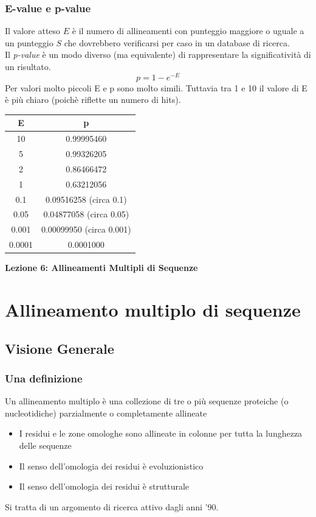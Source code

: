 \documentclass{article}
\begin{document}
\subsubsection{E-value e p-value}
Il valore atteso $E$ è il numero di allineamenti con punteggio
maggiore o uguale a un punteggio $S$ che dovrebbero verificarsi
per caso in un database di ricerca.\\
Il \textit{p-value} è un modo diverso (ma equivalente) di rappresentare
la significatività di un risultato.
$$ p = 1 -e^{-E}$$
Per valori molto piccoli E e p sono molto simili. Tuttavia tra 1 e
10 il valore di E è più chiaro (poichè riflette un numero di hits).
\begin{center}
    \begin{tabular}{c|c}
        E & p \\
        \midrule
        10 & 0.99995460\\
        5 & 0.99326205\\
        2 & 0.86466472\\
        1 & 0.63212056\\
        0.1 & 0.09516258 (circa 0.1)\\
        0.05 & 0.04877058 (circa 0.05)\\
        0.001 & 0.00099950 (circa 0.001)\\
        0.0001 & 0.0001000\\
    \end{tabular}
\end{center}
\begin{titlepage}
    \begin{center}
        \vspace*{1cm}
        \LARGE
        \textbf{Lezione 6: Allineamenti Multipli di Sequenze}

    \end{center}
\end{titlepage}
\section{Allineamento multiplo di sequenze}
\subsection{Visione Generale}
\subsubsection{Una definizione}
Un allineamento multiplo è una collezione di tre o più sequenze proteiche (o nucleotidiche) parzialmente o completamente allineate
\begin{itemize}
    \item I residui e le zone omologhe sono allineate in colonne per tutta la lunghezza delle sequenze
    \item Il senso dell'omologia dei residui è evoluzionistico
    \item Il senso dell'omologia dei residui è strutturale
\end{itemize}
Si tratta di un argomento di ricerca attivo dagli anni '90.
\end{document}

